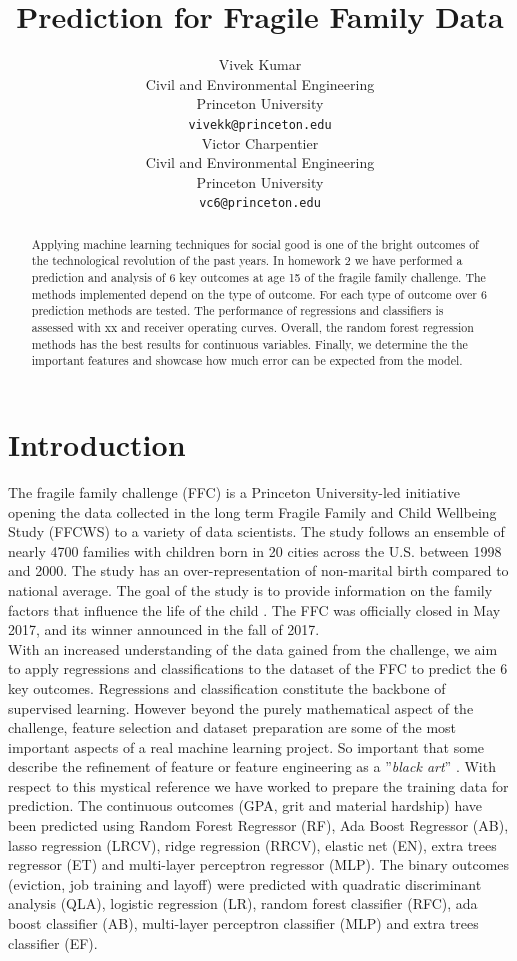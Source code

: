 \documentclass{article} %
\title{Prediction for Fragile Family Data}
\author{
Vivek Kumar\\
Civil and Environmental Engineering\\
Princeton University\\
\texttt{vivekk@princeton.edu} \\
\And
Victor Charpentier\\
Civil and Environmental Engineering\\
Princeton University\\
\texttt{vc6@princeton.edu} \\
}
\begin{document}
\maketitle

\begin{abstract}
Applying machine learning techniques for social good is one of the bright outcomes of the technological revolution of the past years. In homework 2 we have performed a prediction and analysis of 6 key outcomes at age 15 of the fragile family challenge. The methods implemented depend on the type of outcome. For each type of outcome over 6 prediction methods are tested. The performance of regressions and classifiers is assessed with xx and receiver operating curves. Overall, the random forest regression methods has the best results for continuous variables. Finally, we determine the the important features and showcase how much error can be expected from the model.
\end{abstract}
\section{Introduction}
The fragile family challenge (FFC) is a Princeton University-led initiative opening the data collected in the long term Fragile Family and Child Wellbeing Study (FFCWS) to a variety of data scientists. The study follows an ensemble of nearly 4700 families with children born in 20 cities across the U.S. between 1998 and 2000. The study has an over-representation of non-marital birth compared to national average. The goal of the study is to provide information on the family factors that influence the life of the child  \cite{reichman2001fragile}. The FFC was officially closed in May 2017, and its winner announced in the fall of 2017. \\
With an increased understanding of the data gained from the challenge, we aim to apply regressions and classifications to the dataset of the FFC to predict the 6 key outcomes. Regressions and classification constitute the backbone of supervised learning. However beyond the purely mathematical aspect of the challenge, feature selection and dataset preparation are some of the most important aspects of a real machine learning project. So important that some describe the refinement of feature or feature engineering as a ''\textit{black art}'' \cite{domingos2012few}. With respect to this mystical reference we have worked to prepare the training data for prediction. The continuous outcomes (GPA, grit and material hardship) have been predicted using Random Forest Regressor (RF), Ada Boost Regressor (AB), lasso regression (LRCV), ridge regression (RRCV), elastic net (EN), extra trees regressor (ET) and multi-layer perceptron regressor (MLP). The binary outcomes (eviction, job training and layoff) were predicted with quadratic discriminant analysis (QLA), logistic regression (LR), random forest classifier (RFC), ada boost classifier (AB),  multi-layer perceptron classifier (MLP) and extra trees classifier (EF).
\end{document}
